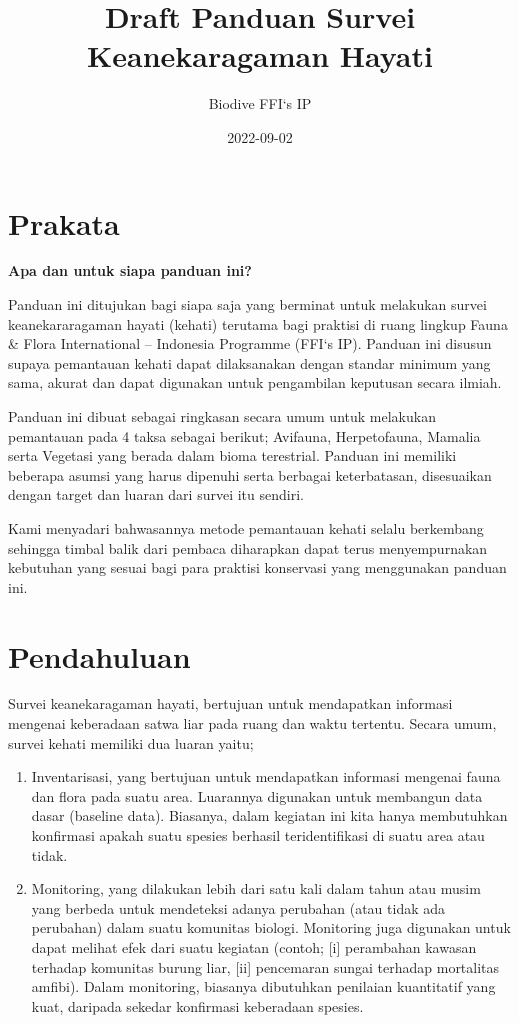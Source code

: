 \documentclass[
]{book}
\title{Draft Panduan Survei Keanekaragaman Hayati}
\author{Biodive FFI`s IP}
\date{2022-09-02}
\begin{document}
\maketitle

{
\setcounter{tocdepth}{1}
\tableofcontents
}
\hypertarget{prakata}{%
\chapter*{Prakata}\label{prakata}}

\textbf{Apa dan untuk siapa panduan ini?}

Panduan ini ditujukan bagi siapa saja yang berminat untuk melakukan survei keanekararagaman hayati (kehati) terutama bagi praktisi di ruang lingkup Fauna \& Flora International -- Indonesia Programme (FFI`s IP). Panduan ini disusun supaya pemantauan kehati dapat dilaksanakan dengan standar minimum yang sama, akurat dan dapat digunakan untuk pengambilan keputusan secara ilmiah.

Panduan ini dibuat sebagai ringkasan secara umum untuk melakukan pemantauan pada 4 taksa sebagai berikut; Avifauna, Herpetofauna, Mamalia serta Vegetasi yang berada dalam bioma terestrial. Panduan ini memiliki beberapa asumsi yang harus dipenuhi serta berbagai keterbatasan, disesuaikan dengan target dan luaran dari survei itu sendiri.

Kami menyadari bahwasannya metode pemantauan kehati selalu berkembang sehingga timbal balik dari pembaca diharapkan dapat terus menyempurnakan kebutuhan yang sesuai bagi para praktisi konservasi yang menggunakan panduan ini.

\hypertarget{pendahuluan}{%
\chapter*{Pendahuluan}\label{pendahuluan}}

Survei keanekaragaman hayati, bertujuan untuk mendapatkan informasi mengenai keberadaan satwa liar pada ruang dan waktu tertentu. Secara umum, survei kehati memiliki dua luaran yaitu;

\begin{enumerate}
\def\labelenumi{(\arabic{enumi})}
\item
  Inventarisasi, yang bertujuan untuk mendapatkan informasi mengenai fauna dan flora pada suatu area. Luarannya digunakan untuk membangun data dasar (baseline data). Biasanya, dalam kegiatan ini kita hanya membutuhkan konfirmasi apakah suatu spesies berhasil teridentifikasi di suatu area atau tidak.
\item
  Monitoring, yang dilakukan lebih dari satu kali dalam tahun atau musim yang berbeda untuk mendeteksi adanya perubahan (atau tidak ada perubahan) dalam suatu komunitas biologi. Monitoring juga digunakan untuk dapat melihat efek dari suatu kegiatan (contoh; {[}i{]} perambahan kawasan terhadap komunitas burung liar, {[}ii{]} pencemaran sungai terhadap mortalitas amfibi). Dalam monitoring, biasanya dibutuhkan penilaian kuantitatif yang kuat, daripada sekedar konfirmasi keberadaan spesies.
\end{enumerate}
\end{document}
